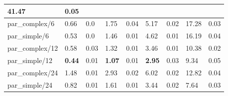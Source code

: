 \documentclass[UTF-8]{article}
\begin{document}
\begin{itemize}
\begin{table}[H]
\begin{tabular}{|lllllllll|}
              \multicolumn{1}{l|}{41.47} &
              0.05 \\ \hline
            \multicolumn{1}{|l|}{par\_complex/6} &
              \multicolumn{1}{l|}{0.66} &
              \multicolumn{1}{l|}{0.0} &
              \multicolumn{1}{l|}{1.75} &
              \multicolumn{1}{l|}{0.04} &
              \multicolumn{1}{l|}{5.17} &
              \multicolumn{1}{l|}{0.02} &
              \multicolumn{1}{l|}{17.28} &
              0.03 \\ \hline
            \multicolumn{1}{|l|}{par\_simple/6} &
              \multicolumn{1}{l|}{0.53} &
              \multicolumn{1}{l|}{0.0} &
              \multicolumn{1}{l|}{1.46} &
              \multicolumn{1}{l|}{0.01} &
              \multicolumn{1}{l|}{4.62} &
              \multicolumn{1}{l|}{0.01} &
              \multicolumn{1}{l|}{16.19} &
              0.04 \\ \hline
            \multicolumn{1}{|l|}{par\_complex/12} &
              \multicolumn{1}{l|}{0.58} &
              \multicolumn{1}{l|}{0.03} &
              \multicolumn{1}{l|}{1.32} &
              \multicolumn{1}{l|}{0.01} &
              \multicolumn{1}{l|}{3.46} &
              \multicolumn{1}{l|}{0.01} &
              \multicolumn{1}{l|}{10.38} &
              0.02 \\ \hline
            \multicolumn{1}{|l|}{par\_simple/12} &
              \multicolumn{1}{l|}{\textbf{0.44}} &
              \multicolumn{1}{l|}{0.01} &
              \multicolumn{1}{l|}{\textbf{1.07}} &
              \multicolumn{1}{l|}{0.01} &
              \multicolumn{1}{l|}{\textbf{2.95}} &
              \multicolumn{1}{l|}{0.03} &
              \multicolumn{1}{l|}{9.34} &
              0.05 \\ \hline
            \multicolumn{1}{|l|}{par\_complex/24} &
              \multicolumn{1}{l|}{1.48} &
              \multicolumn{1}{l|}{0.01} &
              \multicolumn{1}{l|}{2.93} &
              \multicolumn{1}{l|}{0.02} &
              \multicolumn{1}{l|}{6.02} &
              \multicolumn{1}{l|}{0.02} &
              \multicolumn{1}{l|}{12.82} &
              0.04 \\ \hline
            \multicolumn{1}{|l|}{par\_simple/24} &
              \multicolumn{1}{l|}{0.82} &
              \multicolumn{1}{l|}{0.01} &
              \multicolumn{1}{l|}{1.61} &
              \multicolumn{1}{l|}{0.01} &
              \multicolumn{1}{l|}{3.44} &
              \multicolumn{1}{l|}{0.02} &
              \multicolumn{1}{l|}{7.64} &
              0.03 \\ \hline

\end{tabular}
\end{table}
\end{itemize}
\end{document}
